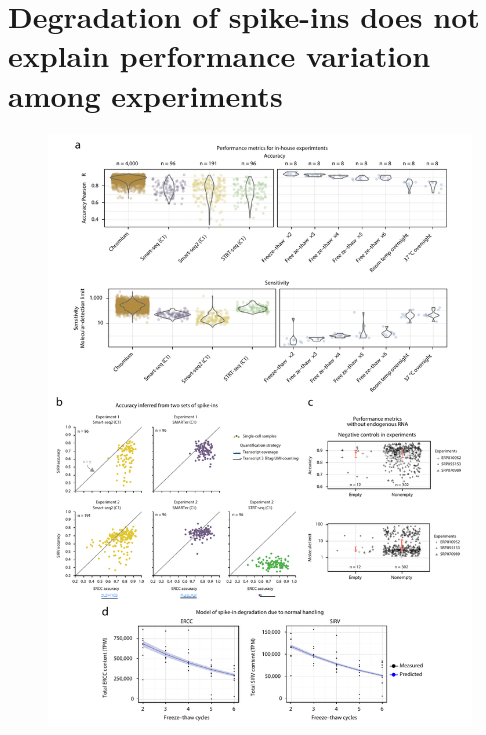 \section{Degradation of spike-ins does not explain performance variation among experiments}

\begin{figure}
    \centering
    \centerline{\includegraphics[width=0.4\paperwidth]{"Figure 4"}}

\end{figure}

